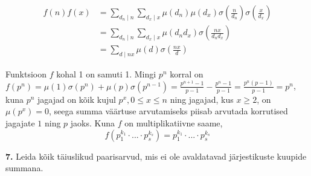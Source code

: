 \documentclass[a4paper, 10pt]{article}
\begin{document}
\begin{align*}
    f(n)f(x)&=\sum_{d_n\mid n}\sum_{d_x\mid x}\mu(d_n)\mu(d_x)\sigma(\frac{n}{d_n})\sigma(\frac{x}{d_x})\\&=\sum_{d_n\mid n}\sum_{d_x\mid x}\mu(d_n d_x)\sigma(\frac{nx}{d_nd_x})\\&=\sum_{d\mid nx}\mu(d)\sigma(\frac{nx}{d})
\end{align*}

Funktsioon $f$ kohal 1 on samuti 1. Mingi $p^n$ korral on $f(p^n)=\mu(1)\sigma(p^n)+\mu(p)\sigma(p^{n-1})=\frac{p^{n+1}-1}{p-1}-\frac{p^n-1}{p-1}=\frac{p^n(p-1)}{p-1}=p^n$, kuna $p^n$ jagajad on kõik kujul $p^x,0\leq x\leq n$ ning jagajad, kus $x\geq 2$, on $\mu(p^x)=0$, seega summa väärtuse arvutamiseks piisab arvutada korrutised jagajate $1$ ning $p$  jaoks. Kuna $f$ on multiplikatiivne saame, 
\begin{equation*}
    f(p_1^{k_1}\cdot ...\cdot p_s^{k_s})=p_1^{k_1}\cdot ... \cdot p_s^{k_s}
\end{equation*}
\bigskip

\noindent \textbf{7.} Leida kõik täiuslikud paarisarvud, mis ei ole avaldatavad järjestikuste kuupide summana. 
\end{document}
